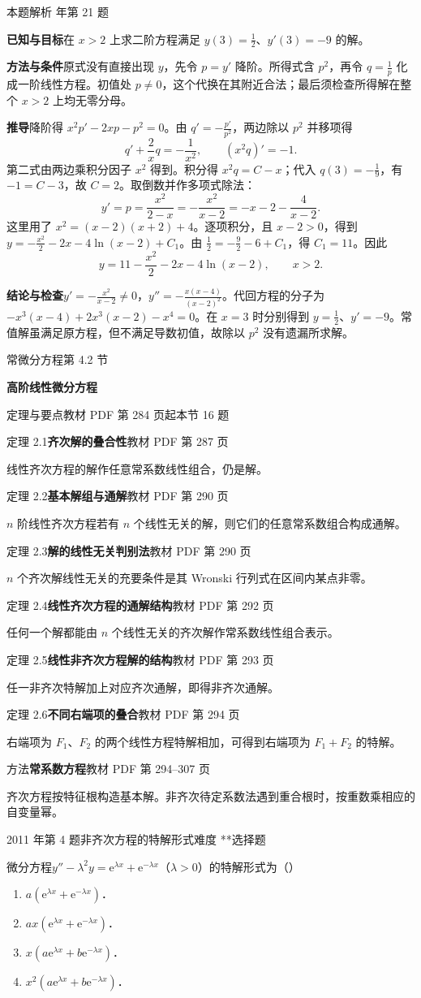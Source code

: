 \documentclass[UTF8,zihao=-4,fontset=fandol]{ctexart}
\newcommand{\SectionHeading}[4]{%
  \clearpage\hypertarget{sec-#1}{}%
  {\small\textcolor{accent}{#2\hfill 第 #1 节}}\par\medskip
  {\LARGE\bfseries #3}\par\smallskip
  {\small\textcolor{muted}{#4}}\par\bigskip}
\newcommand{\Theory}[4]{%
  {\small\textcolor{accent}{#1}\quad\textbf{#3}\hfill\textcolor{muted}{教材 PDF 第 #2 页}}\par
  {\small #4}\par\smallskip}
\newcommand{\pickout}{\hfill（\hspace{1.4em}）}
\newenvironment{abcd}{\begin{enumerate}[label=\textup{(\Alph*)},leftmargin=2.3em,itemsep=1pt,topsep=4pt,parsep=1pt]}{\end{enumerate}}
\newcounter{BankQuestion}
\newcommand{\QuestionPage}[7]{%
  \stepcounter{BankQuestion}%
  \par\noindent\begin{minipage}{\linewidth}
  \raggedright
  {\small\textcolor{black!60}{#3\quad #5\quad 难度 #7}\hfill\textcolor{accent}{#2}}\par\smallskip}
\newcommand{\QuestionEnd}{\end{minipage}\par\medskip}
\newcommand{\QuestionPage}[7]{%
  \clearpage
  \stepcounter{BankQuestion}%
  {\small\textcolor{accent}{#1\hfill #2}}\par\medskip
  {\small\textcolor{black!60}{#3\quad #5\quad 难度 #7\hfill \arabic{BankQuestion} / 234}}\par\vspace{9bp}}
\newcommand{\QuestionEnd}{}
\newenvironment{QuestionSolution}[1]{%
  \clearpage
  {\small\textcolor{black!60}{本题解析\quad #1}}\par\medskip
}{\par\clearpage}
\begin{document}
\begin{QuestionSolution}{2026 年第 21 题}
\textbf{已知与目标}\quad 在 \(x>2\) 上求二阶方程满足 \(y(3)=\frac{1}{2}\)、\(y'(3)=-9\) 的解。

\textbf{方法与条件}\quad 原式没有直接出现 \(y\)，先令 \(p=y'\) 降阶。所得式含 \(p^2\)，再令 \(q=\frac{1}{p}\) 化成一阶线性方程。初值处 \(p\ne0\)，这个代换在其附近合法；最后须检查所得解在整个 \(x>2\) 上均无零分母。

\textbf{推导}\quad 降阶得 \(x^2p'-2xp-p^2=0\)。由 \(q'=-\frac{p'}{p^2}\)，两边除以 \(p^2\) 并移项得
\[
q'+\frac{2}{x}q=-\frac{1}{x^2},\qquad
(x^2q)'=-1.
\]
第二式由两边乘积分因子 \(x^2\) 得到。积分得 \(x^2q=C-x\)；代入 \(q(3)=-\frac{1}{9}\)，有 \(-1=C-3\)，故 \(C=2\)。取倒数并作多项式除法：
\[
y'=p=\frac{x^2}{2-x}=-\frac{x^2}{x-2}=-x-2-\frac{4}{x-2}.
\]
这里用了 \(x^2=(x-2)(x+2)+4\)。逐项积分，且 \(x-2>0\)，得到 \(y=-\frac{x^2}{2}-2x-4\ln(x-2)+C_1\)。由 \(\frac{1}{2}=-\frac{9}{2}-6+C_1\)，得 \(C_1=11\)。因此
\[
\boxed{y=11-\frac{x^2}{2}-2x-4\ln(x-2)},\qquad x>2 .
\]

\textbf{结论与检查}\quad \(y'=-\frac{x^2}{x-2}\ne0\)，\(y''=-\frac{x(x-4)}{(x-2)^2}\)。代回方程的分子为 \(-x^3(x-4)+2x^3(x-2)-x^4=0\)。在 \(x=3\) 时分别得到 \(y=\frac{1}{2}\)、\(y'=-9\)。常值解虽满足原方程，但不满足导数初值，故除以 \(p^2\) 没有遗漏所求解。
\end{QuestionSolution}

\SectionHeading{4.2}{常微分方程}{高阶线性微分方程}{定理与要点\quad 教材 PDF 第 284 页起\hfill 本节 16 题}
\Theory{定理 2.1}{287}{齐次解的叠合性}{线性齐次方程的解作任意常系数线性组合，仍是解。}
\Theory{定理 2.2}{290}{基本解组与通解}{\(n\) 阶线性齐次方程若有 \(n\) 个线性无关的解，则它们的任意常系数组合构成通解。}
\Theory{定理 2.3}{290}{解的线性无关判别法}{\(n\) 个齐次解线性无关的充要条件是其 Wronski 行列式在区间内某点非零。}
\Theory{定理 2.4}{292}{线性齐次方程的通解结构}{任何一个解都能由 \(n\) 个线性无关的齐次解作常系数线性组合表示。}
\Theory{定理 2.5}{293}{线性非齐次方程解的结构}{任一非齐次特解加上对应齐次通解，即得非齐次通解。}
\Theory{定理 2.6}{294}{不同右端项的叠合}{右端项为 \(F_1\)、\(F_2\) 的两个线性方程特解相加，可得到右端项为 \(F_1+F_2\) 的特解。}
\Theory{方法}{294--307}{常系数方程}{齐次方程按特征根构造基本解。非齐次待定系数法遇到重合根时，按重数乘相应的自变量幂。}
\QuestionPage{4.2 高阶线性微分方程}{选择题}{2011 年第 4 题}{1}{非齐次方程的特解形式}{219 / 234}{**}
微分方程$y'' - \lambda^2 y = \mathrm{e}^{\lambda x} + \mathrm{e}^{- \lambda x}$（$\lambda > 0$）的特解形式为\pickout{}
\begin{abcd}
\item $a(\mathrm{e}^{\lambda x} + \mathrm{e}^{- \lambda x})$．
\item $ax(\mathrm{e}^{\lambda x} + \mathrm{e}^{- \lambda x})$．
\item $x(a\mathrm{e}^{\lambda x} + b\mathrm{e}^{- \lambda x})$．
\item $x^2(a\mathrm{e}^{\lambda x} + b\mathrm{e}^{- \lambda x})$．
\end{abcd}
\QuestionEnd
\end{document}
